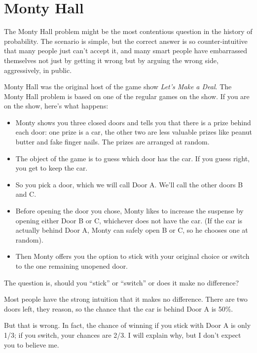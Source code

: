 \documentclass[12pt]{book}
\begin{document}
\section{Monty Hall}

The Monty Hall problem might be the most contentious question in
the history of probability.  The scenario is simple, but the correct
answer is so counter-intuitive that many people just can't accept
it, and many smart people have embarrassed themselves not just by
getting it wrong but by arguing the wrong side, aggressively,
in public.

Monty Hall was the original host of the game show {\em Let's Make a
Deal}.  The Monty Hall problem is based on one of the regular
games on the show.  If you are on the show, here's what happens:

\begin{itemize}

\item Monty shows you three closed doors and tells you that there is a
  prize behind each door: one prize is a car, the other two are less
  valuable prizes like peanut butter and fake finger nails.  The
  prizes are arranged at random.

\item The object of the game is to guess which door has the car.  If
  you guess right, you get to keep the car.

\item So you pick a door, which we will call Door A.  We'll call the
  other doors B and C.

\item Before opening the door you chose, Monty likes to increase the
  suspense by opening either Door B or C, whichever does not
  have the car.  (If the car is actually behind Door A, Monty can
  safely open B or C, so he chooses one at random).

\item Then Monty offers you the option to stick with your original
  choice or switch to the one remaining unopened door.

\end{itemize}

The question is, should you ``stick'' or ``switch'' or does it
make no difference?

Most people have the strong intuition that it makes no difference.
There are two doors left, they reason, so the chance that the car
is behind Door A is 50\%.

But that is wrong.  In fact, the chance of winning if you stick
with Door A is only 1/3; if you switch, your chances are 2/3.
I will explain why, but I don't expect you to believe me.
\end{document}
